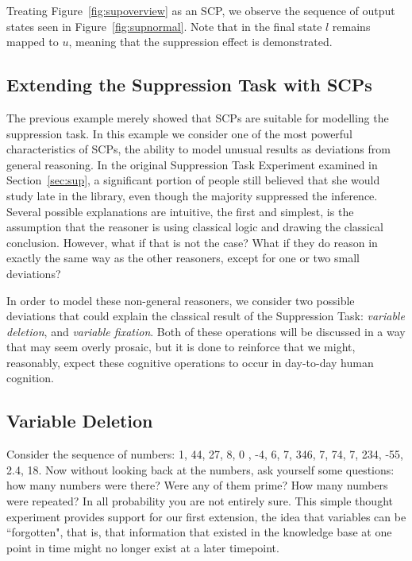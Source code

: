 \documentclass[
11pt, %
english, %
singlespacing, %
headsepline, %
]{MastersDoctoralThesis} %
\begin{document}
Treating Figure~\ref{fig:supoverview} as an SCP, we observe the sequence of output states seen in Figure~\ref{fig:supnormal}. Note that in the final state $l$ remains mapped to $u$, meaning that the suppression effect is demonstrated.

\subsection{Extending the Suppression Task with SCPs}
The previous example merely showed that SCPs are suitable for modelling the suppression task. In this example we consider one of the most powerful characteristics of SCPs, the ability to model unusual results as deviations from general reasoning. In the original Suppression Task Experiment examined in Section~\ref{sec:sup}, a significant portion of people still believed that she would study late in the library, even though the majority suppressed the inference. Several possible explanations are intuitive, the first and simplest, is the assumption that the reasoner is using classical logic and drawing the classical conclusion. However, what if that is not the case? What if they do reason in exactly the same way as the other reasoners, except for one or two small deviations?

In order to model these non-general reasoners, we consider two possible deviations that could explain the classical result of the Suppression Task: \textit{variable deletion}, and\textit{ variable fixation}. Both of these operations will be discussed in a way that may seem overly prosaic, but it is done to reinforce that we might, reasonably, expect these cognitive operations to occur in day-to-day human cognition.

\subsection*{Variable Deletion} \label{ssec:variableDeletion}
Consider the sequence of numbers: 1, 44, 27, 8, 0 , -4, 6, 7, 346, 7, 74, 7, 234, -55, 2.4, 18. Now without looking back at the numbers, ask yourself some questions: how many numbers were there? Were any of them prime? How many numbers were repeated? In all probability you are not entirely sure. This simple thought experiment provides support for our first extension, the idea that variables can be ``forgotten", that is, that information that existed in the knowledge base at one point in time might no longer exist at a later timepoint. 
\end{document}

